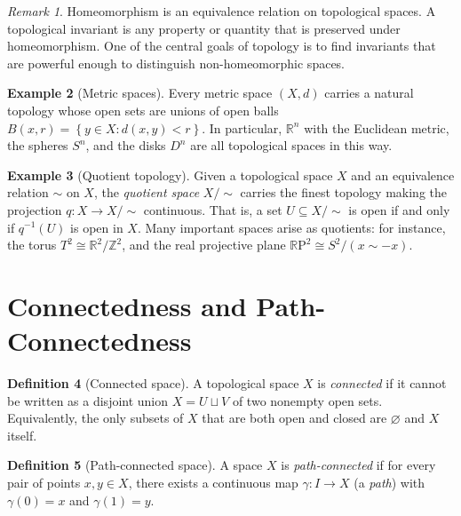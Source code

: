 \documentclass[12pt,a4paper,openany]{book}
\theoremstyle{definition}
\newtheorem{definition}{Definition}[chapter]
\newtheorem{example}[definition]{Example}
\theoremstyle{plain}
\theoremstyle{remark}
\newtheorem{remark}[definition]{Remark}
\newcommand{\Z}{\mathbb{Z}}
\newcommand{\R}{\mathbb{R}}
\newcommand{\RP}{\mathbb{R}\mathrm{P}}
\newcommand{\set}[1]{\left\{#1\right\}}
\begin{document}
\begin{remark}\label{rem:homeo-equiv}
Homeomorphism is an equivalence relation on topological spaces. A topological
invariant is any property or quantity that is preserved under homeomorphism. One
of the central goals of topology is to find invariants that are powerful enough
to distinguish non-homeomorphic spaces.
\end{remark}

\begin{example}[Metric spaces]\label{ex:metric-spaces}
Every metric space $(X, d)$ carries a natural topology whose open sets are
unions of open balls $B(x, r) = \set{y \in X : d(x,y) < r}$. In particular,
$\R^n$ with the Euclidean metric, the spheres $S^n$, and the disks $D^n$ are
all topological spaces in this way.
\end{example}

\begin{example}[Quotient topology]\label{ex:quotient-topology}
Given a topological space $X$ and an equivalence relation $\sim$ on $X$, the
\emph{quotient space} $X/{\sim}$ carries the finest
topology making the projection $q \colon X \to X/{\sim}$ continuous. That is, a
set $U \subseteq X/{\sim}$ is open if and only if $q^{-1}(U)$ is open in $X$.
Many important spaces arise as quotients: for instance, the torus $T^2 \cong
\R^2 / \Z^2$, and the real projective plane $\RP^2 \cong S^2 / (x \sim -x)$.
\end{example}


\section{Connectedness and Path-Connectedness}\label{sec:connectedness}

\begin{definition}[Connected space]\label{def:connected}
A topological space $X$ is \emph{connected} if it cannot
be written as a disjoint union $X = U \sqcup V$ of two nonempty open sets.
Equivalently, the only subsets of $X$ that are both open and closed are
$\varnothing$ and $X$ itself.
\end{definition}

\begin{definition}[Path-connected space]\label{def:path-connected}
A space $X$ is \emph{path-connected} if for every
pair of points $x, y \in X$, there exists a continuous map $\gamma \colon I \to X$
(a \emph{path}) with $\gamma(0) = x$ and $\gamma(1) = y$.
\end{definition}
\end{document}
